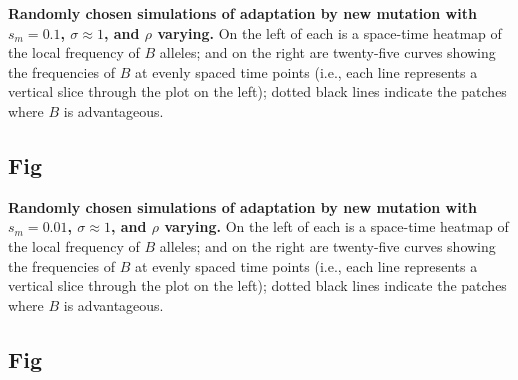 \documentclass[10pt,letterpaper]{article}
\begin{document}
\textbf{Randomly chosen simulations of adaptation by new mutation
with $s_m=0.1$, $\sigma\approx 1$, and $\rho$ varying.}
    On the left of each is a space-time heatmap of the local frequency of $B$ alleles;
    and on the right are twenty-five curves showing the frequencies of $B$ at evenly spaced time points
    (i.e., each line represents a vertical slice through the plot on the left);
    dotted black lines indicate the patches where $B$ is advantageous.


\subsection{Fig}
\label{sfig:sims_2}

\textbf{Randomly chosen simulations of adaptation by new mutation
with $s_m=0.01$, $\sigma\approx 1$, and $\rho$ varying.}
    On the left of each is a space-time heatmap of the local frequency of $B$ alleles;
    and on the right are twenty-five curves showing the frequencies of $B$ at evenly spaced time points
    (i.e., each line represents a vertical slice through the plot on the left);
    dotted black lines indicate the patches where $B$ is advantageous.

\subsection{Fig}
\label{sfig:sims_3}
\end{document}
